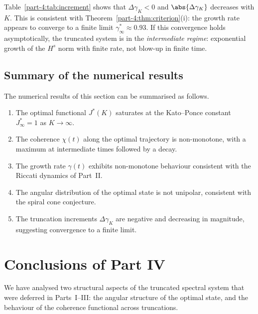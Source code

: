 \begin{remark}\label{part-4:rem:criterion-consistency}
Table~\ref{part-4:tab:increment} shows that $\Delta\gamma_K < 0$ and 
$\abs{\Delta\gamma_K}$ decreases with $K$. This is consistent with 
Theorem~\ref{part-4:thm:criterion}(i): the growth rate appears to converge 
to a finite limit $\gamma^\ast_\infty \approx 0.93$. If this 
convergence holds asymptotically, the truncated system is in the 
\emph{intermediate regime}: exponential growth of the $H^s$ norm 
with finite rate, not blow-up in finite time.
\end{remark}

\subsection{Summary of the numerical results}
\label{part-4:ssec:summary-numeric}

The numerical results of this section can be summarised as follows.

\begin{enumerate}[label=(\arabic*),leftmargin=*]
\item The optimal functional $J^\ast(K)$ saturates at the 
      Kato--Ponce constant $J^\ast_\infty = 1$ as $K\to\infty$.
\item The coherence $\chi(t)$ along the optimal trajectory is 
      non-monotone, with a maximum at intermediate times followed 
      by a decay.
\item The growth rate $\gamma(t)$ exhibits non-monotone behaviour 
      consistent with the Riccati dynamics of Part~II.
\item The angular distribution of the optimal state is not unipolar, 
      consistent with the spiral cone conjecture.
\item The truncation increments $\Delta\gamma_K$ are negative and 
      decreasing in magnitude, suggesting convergence to a finite 
      limit.
\end{enumerate}

\section{Conclusions of Part IV}
\label{part-4:sec:conclusions-IV}

We have analysed two structural aspects of the truncated spectral 
system that were deferred in Parts~I--III: the angular structure of 
the optimal state, and the behaviour of the coherence functional 
across truncations.

